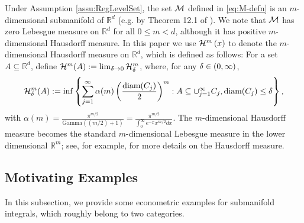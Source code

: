 \documentclass[12pt,american]{article}
\theoremstyle{definition}
\theoremstyle{plain}
\theoremstyle{definition}
\theoremstyle{plain}
\theoremstyle{plain}
\theoremstyle{plain}
\theoremstyle{plain}
\theoremstyle{plain}
\newcommand{\R}{\mathbb{R}}
\begin{document}
Under Assumption \ref{assu:RegLevelSet}, the set ${\cal M}$ defined in \eqref{eq:M-defn} is an $m$-dimensional submanifold of $\R^{d}$ (e.g. by Theorem 12.1 of \citealp{loomis2014advanced}). We note that ${\cal M}$ has zero Lebesgue measure on $\R^{d}$ for all $0\leq m <d$, although it has positive $m$-dimensional Hausdorff measure. In this paper we use ${\cal H}^{m}\left(x\right)$
to denote the $m$-dimensional Hausdorff measure on $\R^{d}$, which is defined as follows: For a set $A\subseteq \R^d$, define ${\cal H}^m(A) := \lim_{\delta \to 0} {\cal H}^m_\delta$, where, for any $\delta\in(0,\infty)$, $${\cal H}^m_\delta(A) := \inf\left\{\sum_{j=1}^\infty \alpha(m) \left(\frac{\text{diam}(C_j)}{2}\right)^m: A \subseteq \cup_{j=1}^\infty C_j, \text{diam}(C_j) \leq \delta\right\},$$ with $\alpha(m)=\frac{\pi^{m/2}}{\text{Gamma}((m/2)+1)}=\frac{\pi^{m/2}}{\int_{0}^{\infty} e^{-x} x^{m/2}dx}$. The $m$-dimensional Hausdorff measure becomes the standard $m$-dimensional Lebesgue measure in the lower dimensional $\R^m$; see, for example, \cite{evans2015measure} for more details on the Hausdorff measure.


\subsection{Motivating Examples}\label{subsec:Examples}

In this subsection, we provide some econometric examples for submanifold integrals, 
which roughly belong to two categories.
\end{document}
